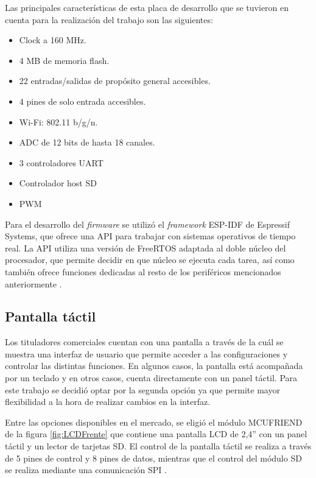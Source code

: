 Las principales características de esta placa de desarrollo que se tuvieron en cuenta para la realización del trabajo son las siguientes:
	\begin{itemize}
		\item Clock a 160 MHz.
		\item 4 MB de memoria flash.
		\item 22 entradas/salidas de propósito general accesibles.
		\item 4 pines de solo entrada accesibles. 
		\item Wi-Fi: 802.11 b/g/n.
		\item ADC de 12 bits de hasta 18 canales.
		\item 3 controladores UART
		\item Controlador host SD
		\item PWM
	\end{itemize}

Para el desarrollo del \textit{firmware} se utilizó el \textit{framework} ESP-IDF de Espressif Systems, que ofrece una API para trabajar con sistemas operativos de tiempo real. La API utiliza una versión de FreeRTOS adaptada al doble núcleo del procesador, 	que permite decidir en que núcleo se ejecuta cada tarea, así como también ofrece funciones dedicadas al resto de los periféricos mencionados anteriormente \citep{WEBSITE:4}.

\vspace{1.5cm}

\subsection{Pantalla táctil}

Los tituladores comerciales cuentan con una pantalla a través de la cuál se muestra una interfaz de usuario que permite acceder a las configuraciones y controlar las distintas funciones. En algunos casos, la pantalla está acompañada por un teclado y en otros casos, cuenta directamente con un panel táctil. Para este trabajo se decidió optar por la segunda opción ya que permite mayor flexibilidad a la hora de realizar cambios en la interfaz.

Entre las opciones disponibles en el mercado, se eligió el módulo MCUFRIEND de la figura \ref{fig:LCDFrente} que contiene una pantalla LCD de 2,4'' con un panel táctil y un lector de tarjetas SD. El control de la pantalla táctil se realiza a través de 5 pines de control y 8 pines de datos, mientras que el control del módulo SD se realiza mediante una comunicación SPI \citep{WEBSITE:5}.

